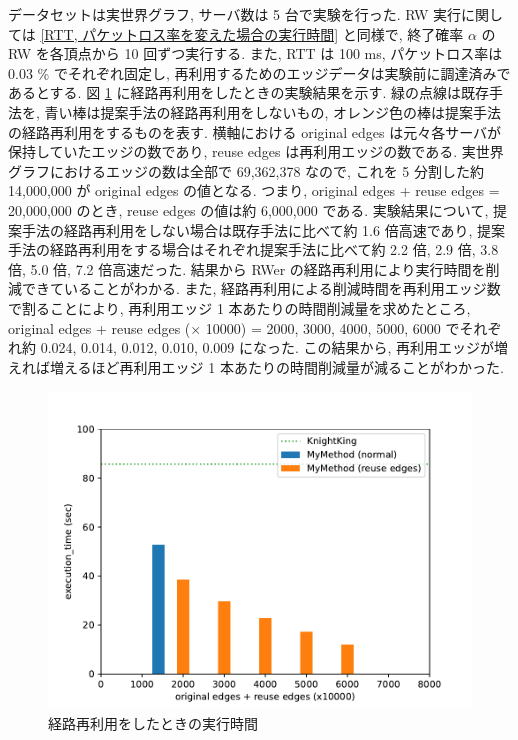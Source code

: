 データセットは実世界グラフ, サーバ数は 5 台で実験を行った. RW 実行に関しては \ref{RTT, パケットロス率を変えた場合の実行時間} と同様で, 終了確率 $\alpha$ の RW を各頂点から 10 回ずつ実行する. また, RTT は 100 ms, パケットロス率は 0.03 \% でそれぞれ固定し, 再利用するためのエッジデータは実験前に調達済みであるとする. 図 \ref{経路再利用をしたときの実行時間} に経路再利用をしたときの実験結果を示す. 緑の点線は既存手法を, 青い棒は提案手法の経路再利用をしないもの, オレンジ色の棒は提案手法の経路再利用をするものを表す. 横軸における original edges は元々各サーバが保持していたエッジの数であり, reuse edges は再利用エッジの数である. 実世界グラフにおけるエッジの数は全部で 69,362,378 なので, これを 5 分割した約 14,000,000 が original edges の値となる. つまり, original edges + reuse edges = 20,000,000 のとき, reuse edges の値は約 6,000,000 である. 実験結果について, 提案手法の経路再利用をしない場合は既存手法に比べて約 1.6 倍高速であり, 提案手法の経路再利用をする場合はそれぞれ提案手法に比べて約 2.2 倍, 2.9 倍, 3.8 倍, 5.0 倍, 7.2 倍高速だった. 結果から RWer の経路再利用により実行時間を削減できていることがわかる. また, 経路再利用による削減時間を再利用エッジ数で割ることにより, 再利用エッジ 1 本あたりの時間削減量を求めたところ, original edges + reuse edges ($\times$ 10000) = 2000, 3000, 4000, 5000, 6000 でそれぞれ約 0.024, 0.014, 0.012, 0.010, 0.009 になった. この結果から, 再利用エッジが増えれば増えるほど再利用エッジ 1 本あたりの時間削減量が減ることがわかった. 

\begin{figure}[t]
    \centering
    \includegraphics[scale=0.8]{figure/AR_cache.pdf}
    \caption{経路再利用をしたときの実行時間}
    \label{経路再利用をしたときの実行時間}
\end{figure}

